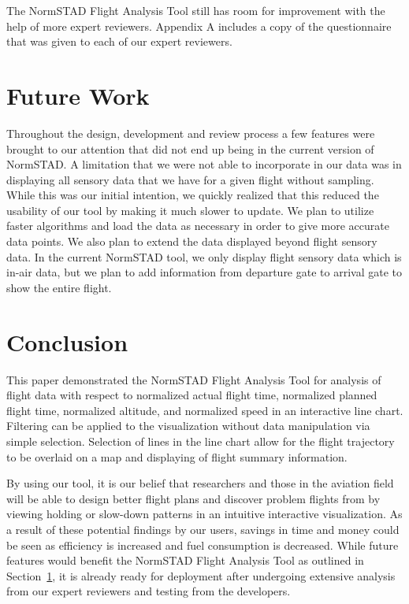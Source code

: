 \documentclass{sig-alternate}
\begin{document}
The NormSTAD Flight Analysis Tool still has room for improvement with the help
of more expert reviewers. Appendix A includes a copy of the questionnaire that 
was given to each of our expert reviewers. 
  
	
\section{Future Work}
\label{sec-future-work}

Throughout the design, development and review process a few features were brought to 
our attention that did not end up being in the current version of NormSTAD. 
A limitation that we were not able to incorporate in our data was in displaying
all sensory data that we have for a given flight without sampling. While this was
our initial intention, we quickly realized that this reduced the usability
of our tool by making it much slower to update.
We plan to utilize faster algorithms and load the data as necessary 
in order to give more accurate data points. We also plan
to extend the data displayed beyond flight sensory data. In the current NormSTAD tool, 
we only display flight sensory data which is 
in-air data, but we plan to add information from 
departure gate to arrival gate to show the entire flight. 

\section{Conclusion}
\label{sec-conclusion}

This paper demonstrated the NormSTAD Flight Analysis Tool for analysis of flight data
with respect to normalized actual flight time, normalized planned flight time, normalized
altitude, and normalized speed in an interactive line chart. Filtering can be applied
to the visualization without data manipulation via simple selection. Selection
of lines in the line chart allow for the flight trajectory to be overlaid on a map
and displaying of flight summary information.

By using our tool, it is our belief
that researchers and those in the aviation field will be able to design better flight plans and
discover problem flights from by viewing holding or slow-down patterns in an intuitive
interactive visualization. As a result of these potential findings by our users,
savings in time and money could be seen as efficiency is increased and fuel consumption
is decreased. While future features would benefit the NormSTAD Flight Analysis Tool
as outlined in Section~\ref{sec-future-work}, it is already ready for deployment after
undergoing extensive analysis from our expert reviewers and testing from the developers.
\end{document}
